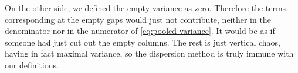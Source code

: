 On the other side, we defined the empty variance as zero. 
Therefore the terms corresponding at the empty gaps would just not contribute, neither in the denominator nor in the numerator of \autoref{eq:pooled-variance}.
It would be as if someone had just cut out the empty columns. The rest is just vertical chaos, having in fact maximal variance,
so the dispersion method is truly immune with our definitions.
 


